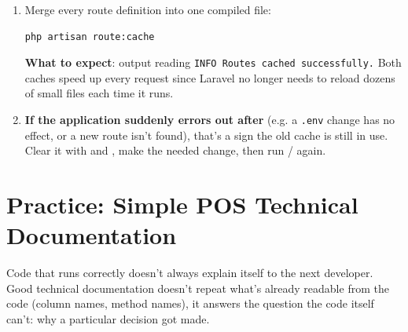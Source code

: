 \begin{enumerate}
  \item Merge every route definition into one compiled file:
    \begin{lstlisting}[language=bash]
php artisan route:cache
    \end{lstlisting}
    \textbf{What to expect}: output reading \texttt{INFO Routes cached
    successfully.} Both caches speed up every request since Laravel no
    longer needs to reload dozens of small files each time it runs.
  \item \textbf{If the application suddenly errors out after
    } (e.g. a \texttt{.env} change has no effect, or
    a new route isn't found), that's a sign the old cache is still in
    use. Clear it with  and
    , make the needed change, then
    run / again.
\end{enumerate}

\section{Practice: Simple POS Technical Documentation}
\label{sec:optimasi-dan-deployment-3}

Code that runs correctly doesn't always explain itself to the next
developer. Good technical documentation doesn't repeat what's already
readable from the code (column names, method names), it answers the
question the code itself can't: why a particular decision got made.

